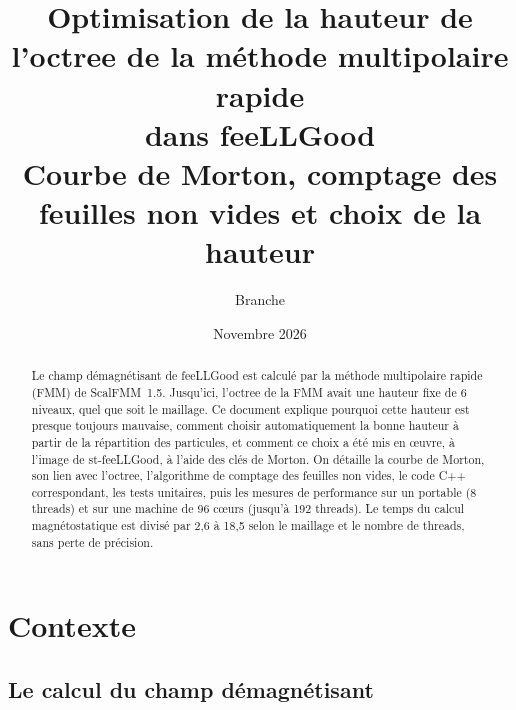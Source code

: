 \documentclass[11pt,a4paper]{article}
\title{Optimisation de la hauteur de l'octree de la méthode multipolaire rapide\\
dans feeLLGood\\[0.5em]
\large Courbe de Morton, comptage des feuilles non vides et choix de la hauteur}
\author{Branche \code{optim\_tree\_height}}
\date{Novembre 2026}
\begin{document}
\sloppy
\maketitle

\begin{abstract}
Le champ démagnétisant de feeLLGood est calculé par la méthode multipolaire rapide (FMM) de
ScalFMM~1.5. Jusqu'ici, l'octree de la FMM avait une hauteur fixe de 6 niveaux, quel que soit le
maillage. Ce document explique pourquoi cette hauteur est presque toujours mauvaise, comment
choisir automatiquement la bonne hauteur à partir de la répartition des particules, et comment ce
choix a été mis en œuvre, à l'image de st-feeLLGood, à l'aide des clés de Morton. On détaille la
courbe de Morton, son lien avec l'octree, l'algorithme de comptage des feuilles non vides, le code
C++ correspondant, les tests unitaires, puis les mesures de performance sur un portable (8 threads)
et sur une machine de 96 cœurs (jusqu'à 192 threads). Le temps du calcul magnétostatique est divisé
par 2,6 à 18,5 selon le maillage et le nombre de threads, sans perte de précision.
\end{abstract}

\tableofcontents

\section{Contexte}

\subsection{Le calcul du champ démagnétisant}
\end{document}
